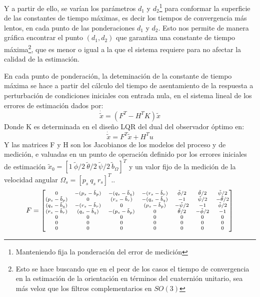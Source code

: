 \documentclass[10pt]{report}
\numberwithin{equation}{chapter}
\numberwithin{algorithm}{chapter}
\begin{document}
Y a partir de ello, se varían los parámetros $d_1$ y $d_2$\footnote{Manteniendo fija la ponderación del error de medición} para conformar la superficie de las constantes de tiempo máximas, es decir los tiempos de convergencia más lentos, en cada punto de las ponderaciones $d_1$ y $d_2$. Esto nos permite de manera gráfica encontrar el punto $(d_1,d_2)$ que garantiza una constante de tiempo máxima\footnote{Esto se hace buscando que en el peor de los casos el tiempo de convergencia en la estimación de la orientación en términos del cuaternión unitario, sea más veloz que los filtros complementarios en $SO(3)$}, que es menor o igual a la que el sistema requiere para no afectar la calidad de la estimación.\par
En cada punto de ponderación, la deteminación de la constante de tiempo máxima se hace a partir del cálculo del tiempo de asentamiento de la respuesta a perturbación de condiciones iniciales con entrada nula, en el sistema lineal de los errores de estimación dados por: 
\begin{equation}
\dot{\tilde{x}}=(F^T-H^TK)\tilde{x}
\end{equation}
Donde K es determinada en el diseño LQR del dual del observador óptimo en:
\begin{equation}
\dot{\tilde{x}}=F^T\tilde{x}+H^Tu
\end{equation}
Y las matrices F y H son los Jacobianos de los modelos del proceso y de medición, e	valuadas en un punto de operación definido por los errores iniciales de estimación $\tilde{x}_0=[1~\tilde{\phi}/2~\tilde{\theta}/2~\tilde{\psi}/2~\tilde{b}_\Omega]^T$ y un valor fijo de la medición de la velocidad angular $\Omega_s=[p_s~q_s~r_s]^T$..
\begin{equation}
\scriptsize F=\begin{bmatrix} 0&-(p_s-\tilde{b}_p)&-(q_s-\tilde{b}_q)&-(r_s-\tilde{b}_r)& \tilde{\phi}/2&\tilde{\theta}/2&\tilde{\psi}/2\\
(p_s-\tilde{b}_p)&0&(r_s-\tilde{b}_r)&-(q_s-\tilde{b}_q)& -1&\tilde{\psi}/2&-\tilde{\theta}/2\\
(q_s-\tilde{b}_q)&-(r_s-\tilde{b}_r)&0&(p_s-\tilde{b}_p)& -\tilde{\psi}/2&-1&\tilde{\phi}/2\\
(r_s-\tilde{b}_r)&(q_s-\tilde{b}_q)&-(p_s-\tilde{b}_p)&0& \tilde{\theta}/2&-\tilde{\phi}/2&-1\\
0&0&0&0&0&0&0\\0&0&0&0&0&0&0\\0&0&0&0&0&0&0\\
\end{bmatrix}\normalsize
\end{equation}
\end{document}
